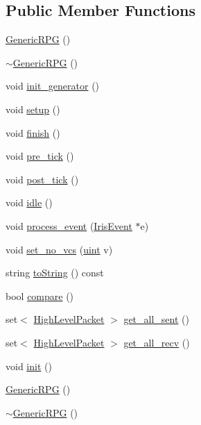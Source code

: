 \subsection*{Public Member Functions}
\begin{CompactItemize}
\item 
\hyperlink{classGenericRPG_d909c0fb57cf1b74bacbb0798aa97b29}{GenericRPG} ()
\item 
\hyperlink{classGenericRPG_cff866cbb752b594437b5ddca59e0f03}{$\sim$GenericRPG} ()
\item 
void \hyperlink{classGenericRPG_addf993ae78d1b14589750c78d095aa4}{init\_\-generator} ()
\item 
void \hyperlink{classGenericRPG_e872cb83c70fbf7139fbf1b5cf14310f}{setup} ()
\item 
void \hyperlink{classGenericRPG_03ec120747d2935217291fe23f4c36dd}{finish} ()
\item 
void \hyperlink{classGenericRPG_f6fb1e75e66557481557760c1958612c}{pre\_\-tick} ()
\item 
void \hyperlink{classGenericRPG_f980f5bdb2b703f436b00bb8a318b2fb}{post\_\-tick} ()
\item 
void \hyperlink{classGenericRPG_661b35dacbf7bae62164df5fc1b73477}{idle} ()
\item 
void \hyperlink{classGenericRPG_72d08c87beeb16514c6c81af3296f6af}{process\_\-event} (\hyperlink{classIrisEvent}{IrisEvent} $\ast$e)
\item 
void \hyperlink{classGenericRPG_0f15df71a8cb244d55a2dce961b7a972}{set\_\-no\_\-vcs} (\hyperlink{outputBuffer_8h_91ad9478d81a7aaf2593e8d9c3d06a14}{uint} v)
\item 
string \hyperlink{classGenericRPG_a4303867728559ab6e6ae3d1390ede71}{toString} () const 
\item 
bool \hyperlink{classGenericRPG_4b7a50fa77416fc8b4f16948fb4da592}{compare} ()
\item 
set$<$ \hyperlink{classHighLevelPacket}{HighLevelPacket} $>$ \hyperlink{classGenericRPG_7f855d4d69dc3f019dffdf63d29e2bf4}{get\_\-all\_\-sent} ()
\item 
set$<$ \hyperlink{classHighLevelPacket}{HighLevelPacket} $>$ \hyperlink{classGenericRPG_e6ad83dd5abf9673db6f8bd713979392}{get\_\-all\_\-recv} ()
\item 
void \hyperlink{classGenericRPG_83b1fba5595a25b24b32374ec8e85020}{init} ()
\item 
\hyperlink{classGenericRPG_d909c0fb57cf1b74bacbb0798aa97b29}{GenericRPG} ()
\item 
\hyperlink{classGenericRPG_cff866cbb752b594437b5ddca59e0f03}{$\sim$GenericRPG} ()

\end{CompactItemize}
